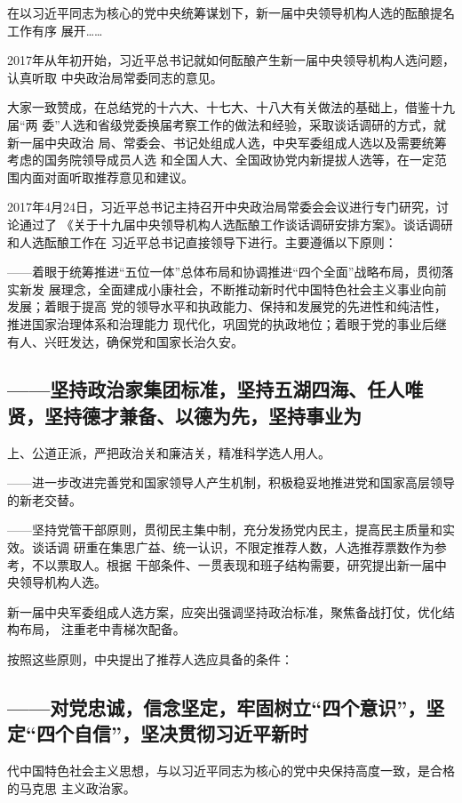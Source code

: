\documentclass[11pt]{ctexart}
\begin{document}
{{{{在以习近平同志为核心的党中央统筹谋划下，新一届中央领导机构人选的酝酿提名工作有序
展开……

2017年从年初开始，习近平总书记就如何酝酿产生新一届中央领导机构人选问题，认真听取
中央政治局常委同志的意见。

大家一致赞成，在总结党的十六大、十七大、十八大有关做法的基础上，借鉴十九届“两
委”人选和省级党委换届考察工作的做法和经验，采取谈话调研的方式，就新一届中央政治
局、常委会、书记处组成人选，中央军委组成人选以及需要统筹考虑的国务院领导成员人选
和全国人大、全国政协党内新提拔人选等，在一定范围内面对面听取推荐意见和建议。

2017年4月24日，习近平总书记主持召开中央政治局常委会会议进行专门研究，讨论通过了
《关于十九届中央领导机构人选酝酿工作谈话调研安排方案》。谈话调研和人选酝酿工作在
习近平总书记直接领导下进行。主要遵循以下原则：

——着眼于统筹推进“五位一体”总体布局和协调推进“四个全面”战略布局，贯彻落实新发
展理念，全面建成小康社会，不断推动新时代中国特色社会主义事业向前发展；着眼于提高
党的领导水平和执政能力、保持和发展党的先进性和纯洁性，推进国家治理体系和治理能力
现代化，巩固党的执政地位；着眼于党的事业后继有人、兴旺发达，确保党和国家长治久安。

\subsection{——坚持政治家集团标准，坚持五湖四海、任人唯贤，坚持德才兼备、以德为先，坚持事业为}
\label{sec:org0a5f162}
上、公道正派，严把政治关和廉洁关，精准科学选人用人。

——进一步改进完善党和国家领导人产生机制，积极稳妥地推进党和国家高层领导的新老交替。

——坚持党管干部原则，贯彻民主集中制，充分发扬党内民主，提高民主质量和实效。谈话调
研重在集思广益、统一认识，不限定推荐人数，人选推荐票数作为参考，不以票取人。根据
干部条件、一贯表现和班子结构需要，研究提出新一届中央领导机构人选。

新一届中央军委组成人选方案，应突出强调坚持政治标准，聚焦备战打仗，优化结构布局，
注重老中青梯次配备。

按照这些原则，中央提出了推荐人选应具备的条件：

\subsection{——对党忠诚，信念坚定，牢固树立“四个意识”，坚定“四个自信”，坚决贯彻习近平新时}
\label{sec:orgcba6b98}
代中国特色社会主义思想，与以习近平同志为核心的党中央保持高度一致，是合格的马克思
主义政治家。

}}}}
\end{document}
